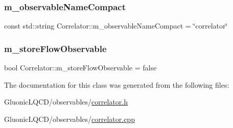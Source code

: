 \subsubsection{\texorpdfstring{m\_observableNameCompact}{m\_observableNameCompact}}
{\footnotesize\ttfamily const std\+::string Correlator\+::m\+\_\+observable\+Name\+Compact = \char`\"{}correlator\char`\"{}\hspace{0.3cm}{\ttfamily [protected]}}

\mbox{\label{class_correlator_aac0590e0ae6e3edc790279931b06a03c}} 
\subsubsection{\texorpdfstring{m\_storeFlowObservable}{m\_storeFlowObservable}}
{\footnotesize\ttfamily bool Correlator\+::m\+\_\+store\+Flow\+Observable = false\hspace{0.3cm}{\ttfamily [protected]}}



The documentation for this class was generated from the following files\+:\begin{DoxyCompactItemize}
\item 
Gluonic\+L\+Q\+C\+D/observables/\mbox{\hyperlink{correlator_8h}{correlator.\+h}}\item 
Gluonic\+L\+Q\+C\+D/observables/\mbox{\hyperlink{correlator_8cpp}{correlator.\+cpp}}\end{DoxyCompactItemize}

